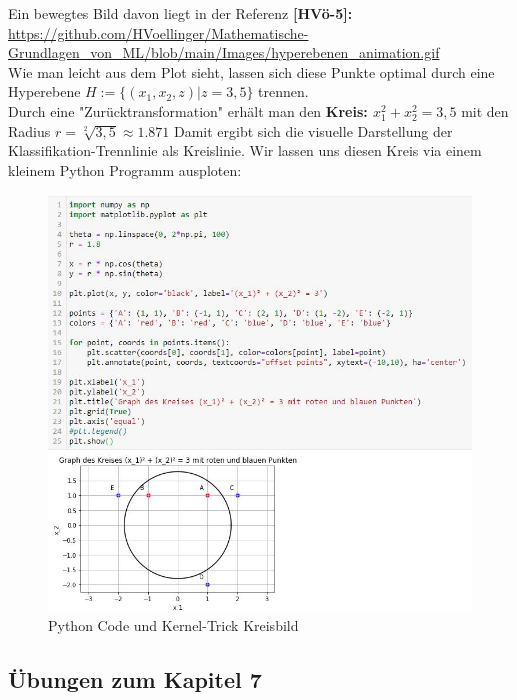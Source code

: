 \documentclass[12pt]{article}
\begin{document}
Ein bewegtes Bild davon liegt in der Referenz \textbf{[HVö-5]:} \url{https://github.com/HVoellinger/Mathematische-Grundlagen_von_ML/blob/main/Images/hyperebenen_animation.gif}\\[0.2cm]

Wie man leicht aus dem Plot sieht, lassen sich diese Punkte optimal durch eine Hyperebene ${H := \lbrace (x_1,x_2,z)| z=3,5\rbrace}$ trennen.\\ 
Durch eine "Zurücktransformation" erhält man den \textbf{Kreis: $x_1^2+x_2^2=3,5$ } mit den Radius $r = \sqrt[2]{3,5} \approx 1.871 $  Damit ergibt sich die visuelle Darstellung der Klassifikation-Trennlinie als Kreislinie. Wir lassen uns diesen Kreis via einem kleinem Python Programm ausploten:\\[0.2cm]
\begin{figure}[tp]
  \centering
  \hspace*{-0.1cm} 
  \includegraphics[width=1.1\textwidth]{SVM-Kreisbild-Python}
  \caption{Python Code und Kernel-Trick Kreisbild}       
  \label{fig:SVM_Kreis}
\end{figure}

\newpage

\subsection{Übungen zum Kapitel 7}
\end{document}
